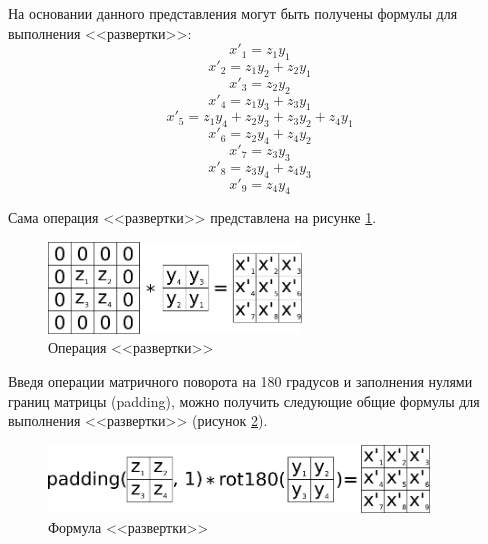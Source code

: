 На основании данного представления могут быть получены формулы для выполнения <<развертки>>:
\begin{equation*}
	x'_1 = z_1y_1		
	\end{equation*}
	\begin{equation*}
	x'_2 = z_1y_2+z_2y_1
	\end{equation*}
	\begin{equation*}
	x'_3 = z_2y_2
	\end{equation*}
	\begin{equation*}
	x'_4 = z_1y_3 + z_3y_1
	\end{equation*}
	\begin{equation*}
	x'_5 = z_1y_4 + z_2y_3 + z_3y_2 + z_4y_1
	\end{equation*}
	\begin{equation*}
	x'_6 = z_2y_4 + z_4y_2
	\end{equation*}
	\begin{equation*}
	x'_7 = z_3y_3
	\end{equation*}
	\begin{equation*}
	x'_8 = z_3y_4 + z_4y_3
	\end{equation*}		
	\begin{equation*}
	x'_9 = z_4y_4
	\end{equation*}	

Сама операция <<развертки>> представлена на рисунке \ref{fig:deconvolution}.

\begin{figure}[H]
  \centering
  \includegraphics[width=0.6\textwidth]{man-source/images/ch2/pic2-6.png}
  \caption{Операция <<развертки>>}
  \label{fig:deconvolution}
\end{figure}

Введя операции матричного поворота на 180 градусов и заполнения нулями границ матрицы (padding), можно получить следующие общие формулы для выполнения <<развертки>> (рисунок \ref{fig:deconvolution_formula}).

\begin{figure}[H]
  \centering
  \includegraphics[width=0.9\textwidth]{man-source/images/ch2/pic2-9.png}
  \caption{Формула <<развертки>>}
  \label{fig:deconvolution_formula}
\end{figure}

